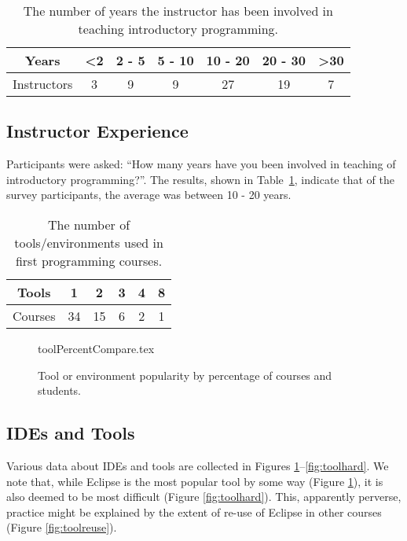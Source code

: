 \documentclass{sig-alternate}
\begin{document}
\begin{table}[h]
\centering
\caption{The number of years the instructor has been involved in teaching introductory programming.}
\label{tab:yearsTeaching}
\begin{tabular}{ccccccc}
\hline
Years       & \textless 2 & 2 - 5 & 5 - 10 & 10 - 20 & 20 - 30 & \textgreater 30 \\ \hline
Instructors & 3          & 9     & 9      & 27      & 19      & 7              \\ \hline
\end{tabular}
\end{table}
\subsection{Instructor Experience}
Participants were asked: ``How many years have you been involved in teaching of introductory programming?''. The results, shown in Table~\ref{tab:yearsTeaching}, indicate that of the survey participants, the average was between 10 - 20 years.

\begin{table}[]
\centering
\caption{The number of tools/environments used in first programming courses.}
\label{tab:numTools}
\begin{tabular}{cccccc}
\hline
Tools   & 1  & 2  & 3 & 4 & 8 \\ \hline
Courses & 34 & 15 & 6 & 2 & 1 \\ \hline
\end{tabular}
\end{table}

\begin{figure}
\begin{center}
{toolPercentCompare.tex}
\caption{Tool or environment popularity by percentage of courses and students.\label{fig:tools}}
\end{center}
\end{figure}
\subsection{IDEs and Tools}
Various data about IDEs and tools are collected in Figures \ref{fig:tools}--\ref{fig:toolhard}. We note that, while Eclipse is the most popular tool by some way (Figure \ref{fig:tools}), it is also deemed to be most difficult (Figure \ref{fig:toolhard}). This, apparently perverse, practice might be explained by the extent of re-use of Eclipse in other courses (Figure \ref{fig:toolreuse}).
\end{document}
